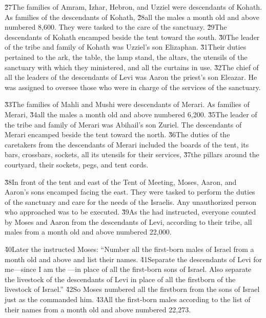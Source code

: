 \v{27}The families of Amram, Izhar, Hebron, and Uzziel were descendants of Kohath. As families of the descendants of Kohath, \v{28}all the males a month old and above numbered 8,600. They were tasked to the care of the sanctuary. \v{29}The descendants of Kohath encamped beside the tent toward the south. \v{30}The leader of the tribe and family of Kohath was Uzziel's son Elizaphan. \v{31}Their duties pertained to the ark, the table, the lamp stand, the altars, the utensils of the sanctuary with which they ministered, and all the curtains in use. \v{32}The chief of all the leaders of the descendants of Levi was Aaron the priest's son Eleazar. He was assigned to oversee those who were in charge of the services of the sanctuary.

\v{33}The families of Mahli and Mushi were descendants of Merari. As families of Merari, \v{34}all the males a month old and above numbered 6,200. \v{35}The leader of the tribe and family of Merari was Abihail's son Zuriel. The descendants of Merari encamped beside the tent toward the north. \v{36}The duties of the caretakers from the descendants of Merari included the boards of the tent, its bars, crossbars, sockets, all its utensils for their services, \v{37}the pillars around the courtyard, their sockets, pegs, and tent cords.

\v{38}In front of the tent and east of the Tent of Meeting, Moses, Aaron, and Aaron's sons encamped facing the east. They were tasked to perform the duties of the sanctuary and care for the needs of the Israelis. Any unauthorized person who approached was to be executed. \v{39}As the  had instructed, everyone counted by Moses and Aaron from the descendants of Levi, according to their tribe, all males from a month old and above numbered 22,000.

\v{40}Later the  instructed Moses: ``Number all the first-born males of Israel from a month old and above and list their names. \v{41}Separate the descendants of Levi for me---since I am the ---in place of all the first-born sons of Israel. Also separate the livestock of the descendants of Levi in place of all the firstborn of the livestock of Israel.'' \v{42}So Moses numbered all the firstborn from the sons of Israel just as the  commanded him. \v{43}All the first-born males according to the list of their names from a month old and above numbered 22,273.

